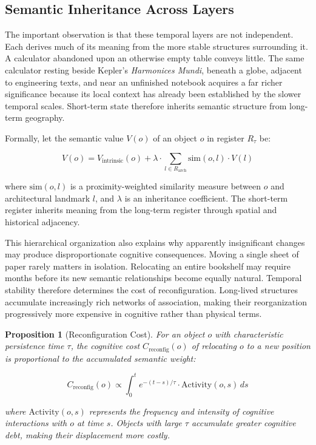 \documentclass[12pt,oneside]{article}
\newtheorem{proposition}[definition]{Proposition}
\theoremstyle{remark}
\begin{document}
\subsection{Semantic Inheritance Across Layers}

The important observation is that these temporal layers are not independent. Each derives much of its meaning from the more stable structures surrounding it. A calculator abandoned upon an otherwise empty table conveys little. The same calculator resting beside Kepler's \emph{Harmonices Mundi}, beneath a globe, adjacent to engineering texts, and near an unfinished notebook acquires a far richer significance because its local context has already been established by the slower temporal scales. Short-term state therefore inherits semantic structure from long-term geography.

Formally, let the semantic value $V(o)$ of an object $o$ in register $R_{\tau}$ be:

\begin{equation}
V(o) = V_{\text{intrinsic}}(o) + \lambda \cdot \sum_{l \in R_{\text{arch}}} \text{sim}(o, l) \cdot V(l)
\end{equation}

where $\text{sim}(o, l)$ is a proximity-weighted similarity measure between $o$ and architectural landmark $l$, and $\lambda$ is an inheritance coefficient. The short-term register inherits meaning from the long-term register through spatial and historical adjacency.

This hierarchical organization also explains why apparently insignificant changes may produce disproportionate cognitive consequences. Moving a single sheet of paper rarely matters in isolation. Relocating an entire bookshelf may require months before its new semantic relationships become equally natural. Temporal stability therefore determines the cost of reconfiguration. Long-lived structures accumulate increasingly rich networks of association, making their reorganization progressively more expensive in cognitive rather than physical terms.

\begin{proposition}[Reconfiguration Cost]
For an object $o$ with characteristic persistence time $\tau$, the cognitive cost $C_{\text{reconfig}}(o)$ of relocating $o$ to a new position is proportional to the accumulated semantic weight:

\begin{equation}
C_{\text{reconfig}}(o) \propto \int_{0}^{t} e^{-(t-s)/\tau} \cdot \text{Activity}(o, s) \, ds
\end{equation}

where $\text{Activity}(o, s)$ represents the frequency and intensity of cognitive interactions with $o$ at time $s$. Objects with large $\tau$ accumulate greater cognitive debt, making their displacement more costly.
\end{proposition}
\end{document}
